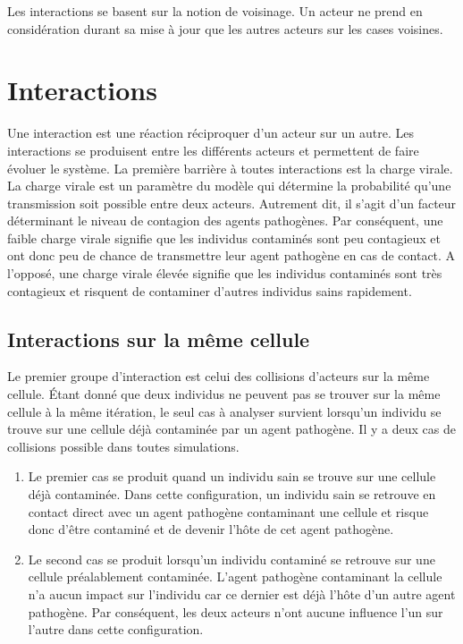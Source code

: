 Les interactions se basent sur la notion de voisinage. Un acteur ne prend en considération durant sa mise à jour que les autres acteurs sur les cases voisines.

\section{Interactions}

Une interaction est une réaction réciproquer d'un acteur sur un autre. Les interactions se produisent entre les différents acteurs et permettent de faire évoluer le système. La première barrière à toutes interactions est la charge virale. La charge virale est un paramètre du modèle qui détermine la probabilité qu'une transmission soit possible entre deux acteurs. Autrement dit, il s'agit d'un facteur déterminant le niveau de contagion des agents pathogènes. Par conséquent, une faible charge virale signifie que les individus contaminés sont peu contagieux et ont donc peu de chance de transmettre leur agent pathogène en cas de contact. A l'opposé, une charge virale élevée signifie que les individus contaminés sont très contagieux et risquent de contaminer d'autres individus sains rapidement.\\

\subsection{Interactions sur la même cellule}

Le premier groupe d'interaction est celui des collisions d'acteurs sur la même cellule. Étant donné que deux individus ne peuvent pas se trouver sur la même cellule à la même itération, le seul cas à analyser survient lorsqu'un individu se trouve sur une cellule déjà contaminée par un agent pathogène. Il y a deux cas de collisions possible dans toutes simulations.

\begin{enumerate}
	\item Le premier cas se produit quand un individu sain se trouve sur une cellule déjà contaminée. Dans cette configuration, un individu sain se retrouve en contact direct avec un agent pathogène contaminant une cellule et risque donc d'être contaminé et de devenir l'hôte de cet agent pathogène.
	\item Le second cas se produit lorsqu'un individu contaminé se retrouve sur une cellule préalablement contaminée. L'agent pathogène contaminant la cellule n'a aucun impact sur l'individu car ce dernier est déjà l'hôte d'un autre agent pathogène. Par conséquent, les deux acteurs n'ont aucune influence l'un sur l'autre dans cette configuration.
\end{enumerate}

